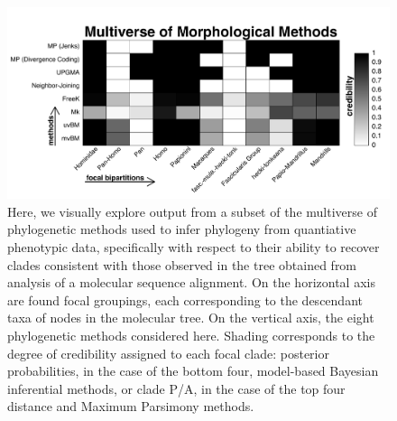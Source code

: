 \documentclass[10pt, twocolumn, twoside]{article}
\begin{document}
\begin{figure}[h]
\centering
\includegraphics[width=160mm]{figures/harvati_figure0_multiverse_alt.pdf}
\caption[Visualizing Results of Model-Based Phylogenetic Analyses of Catarrhine Landmark Data]{Here, we visually explore output from a subset of the multiverse of phylogenetic methods used to infer phylogeny from quantiative phenotypic data, specifically with respect to their ability to recover clades consistent with those observed in the tree obtained from analysis of a molecular sequence alignment. On the horizontal axis are found focal groupings, each corresponding to the descendant taxa of nodes in the molecular tree. On the vertical axis, the eight phylogenetic methods considered here. Shading corresponds to the degree of credibility assigned to each focal clade: posterior probabilities, in the case of the bottom four, model-based Bayesian inferential methods, or clade P/A, in the case of the top four distance and Maximum Parsimony methods.  \label{overflow}
\label{fig:harvatiFigure0}}
\end{figure}
\end{document}
